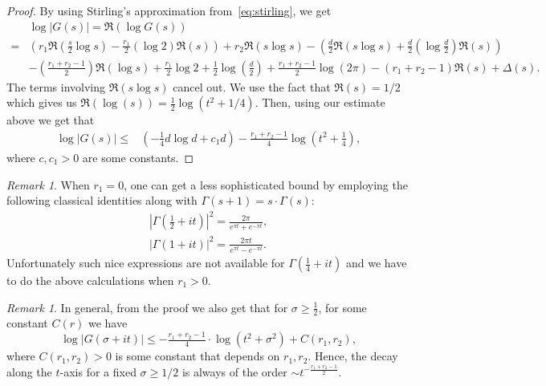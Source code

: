 \documentclass[a4paper]{article}
\theoremstyle{definition}
\theoremstyle{remark}
\newtheorem{remark}[theorem]{Remark}
\begin{document}
\begin{proof}
By using Stirling's approximation from~\cref{eq:stirling}, we get 
\begin{align}
    & \log |G(s)| 
    =  \Re( \log G(s)) \\
    = & \left( r_{1} \Re(\tfrac{s}{2} \log {s}) -   \tfrac{r_{1}}{2}(\log 2)\Re({s} )  \right) 
    + r_{2} \Re (s \log s) 
    - \left(\tfrac{d}{2} \Re(s \log s) + \tfrac{d}{2} (\log \tfrac{d}{2})\Re(s )  \right) \\ 
      & - \left(\tfrac{r_{1}+r_{2}-1}{2}\right) \Re(\log s) 
      + \tfrac{r_{1}}{2} \log 2 +  \tfrac{1}{2}\log (\tfrac{d}{2})  + \tfrac{r_{1}+r_{2} - 1 }{2} \log (2 \pi) 
      -(r_{1}+r_{2}-1)\Re(s)
 +
      \Delta(s) .
\end{align}
The terms involving $\Re(s \log s)$ cancel out.
We use the fact that $\Re(s) = 1/2$ which gives us $\Re(\log (s)) = \tfrac{1}{2}\log (t^{2} + 1/4)$. 
Then, using our estimate above
we get that 
\begin{align}
     \log |G(s)|  
     \leq &   
     \left( -\tfrac{1}{4} d \log d + c_{1} d \right)  - \tfrac{r_{1}+r_{2}-1}{4}\log\left( t^{2} + \tfrac{1}{4}\right),
\end{align}
where $c,c_{1} > 0$ are some constants.
\end{proof}

\begin{remark}
  When $r_{1}=0$, one can get a less sophisticated bound by employing
	the following classical identities along with $\Gamma(s+1)=s \cdot \Gamma(s)$:
	\begin{align}
	  |\Gamma(\tfrac{1}{2}+it)|^{2}
	  = \frac{2\pi}{e^{\pi t} + e^{-\pi t}}, \\
	  |\Gamma(1+it)|^{2}
	  = \frac{2\pi t}{e^{\pi t} - e^{-\pi t}}.
	\end{align}
	Unfortunately such nice expressions are not available for $\Gamma(\tfrac{1}{4} + it)$ and we have to do the above calculations when $r_{1}>0$.
\end{remark}

\begin{remark}
\label{re:sigma_not_half}
In general, from the proof we also get that for $ \sigma \geq \frac{1}{2}$, for some constant $C(r)$ we have 
\begin{equation}
\log |G(\sigma + it)|
\leq  -\tfrac{r_{1}+r_{2}-1}{4} \cdot \log (t^{2} + \sigma^{2}) +  C(r_{1},r_{2}),
\end{equation}
where $C(r_{1},r_{2})>0$ is some constant that depends on $r_{1},r_{2}$. Hence, the decay along the $t$-axis for a fixed $\sigma \geq 1/2$ is always of the order $ \sim t ^ {-\frac{r_{1}+r_{2}-1}{2}}$.
\end{remark}
\end{document}
